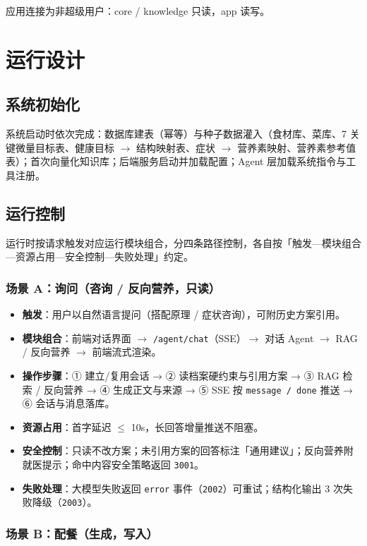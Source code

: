 \documentclass[12pt,a4paper]{ctexart}
\begin{document}
\noindent 应用连接为非超级用户：core / knowledge 只读，app 读写。

\section{运行设计}

\subsection{系统初始化}

系统启动时依次完成：数据库建表（幂等）与种子数据灌入（食材库、菜库、7 关键微量目标表、健康目标 $\rightarrow$ 结构映射表、症状 $\rightarrow$ 营养素映射、营养素参考值表）；首次向量化知识库；后端服务启动并加载配置；Agent 层加载系统指令与工具注册。

\subsection{运行控制}

运行时按请求触发对应运行模块组合，分四条路径控制，各自按「触发—模块组合—资源占用—安全控制—失败处理」约定。

\subsubsection*{场景 A：询问（咨询 / 反向营养，只读）}

\begin{itemize}
\item \textbf{触发}：用户以自然语言提问（搭配原理 / 症状咨询），可附历史方案引用。
\item \textbf{模块组合}：前端对话界面 $\rightarrow$ \texttt{/agent/chat}（SSE）$\rightarrow$ 对话 Agent $\rightarrow$ RAG / 反向营养 $\rightarrow$ 前端流式渲染。
\item \textbf{操作步骤}：① 建立/复用会话 → ② 读档案硬约束与引用方案 → ③ RAG 检索 / 反向营养 → ④ 生成正文与来源 → ⑤ SSE 按 \texttt{message / done} 推送 → ⑥ 会话与消息落库。
\item \textbf{资源占用}：首字延迟 $\le$ 10s，长回答增量推送不阻塞。
\item \textbf{安全控制}：只读不改方案；未引用方案的回答标注「通用建议」；反向营养附就医提示；命中内容安全策略返回 \texttt{3001}。
\item \textbf{失败处理}：大模型失败返回 \texttt{error} 事件（\texttt{2002}）可重试；结构化输出 3 次失败降级（\texttt{2003}）。
\end{itemize}

\subsubsection*{场景 B：配餐（生成，写入）}
\end{document}
